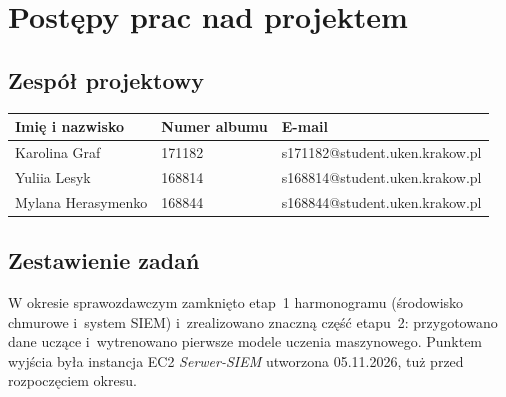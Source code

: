 \documentclass[11pt,a4paper,oneside]{article}
\newif\ifpodpowiedzi
\newcommand{\podpowiedz}[1]{\ifpodpowiedzi\par\begingroup\small\color{hintcolor}\textit{Wskazówka: #1}\par\endgroup\fi}
\newcommand{\studentA}{{Karolina Graf}}
\newcommand{\studentB}{{Yuliia Lesyk}}
\newcommand{\studentC}{{Mylana Herasymenko}}
\newcommand{\albumA}{{171182}}
\newcommand{\albumB}{{168814}}
\newcommand{\albumC}{{168844}}
\begin{document}
\section{Postępy prac nad projektem}
\subsection{Zespół projektowy}
\podpowiedz{Podaj aktualne dane kontaktowe wszystkich członków zespołu. Imiona i nazwiska powinny być zgodne ze stroną tytułową. W przypadku zespołu dwuosobowego zatwierdzonego przez dyrekcję instytutu usuń dane trzeciej osoby ze strony tytułowej, obu tabel oraz odpowiedni blok opisu prac.}
\begin{tabularx}{\textwidth}{@{}Y p{0.22\textwidth} Y@{}}
\toprule
Imię i nazwisko & Numer albumu & E-mail\\
\midrule
\studentA & \albumA & {s171182@student.uken.krakow.pl}\\
\studentB & \albumB & {s168814@student.uken.krakow.pl}\\
\studentC & \albumC & {s168844@student.uken.krakow.pl}\\
\bottomrule
\end{tabularx}

\subsection{Zestawienie zadań}
\podpowiedz{Dla każdej osoby wymień zadania z danego okresu i ich stan: zakończone, w toku lub zablokowane. Przy pracy wspólnej wskaż konkretny wkład każdej osoby. Odwołania do opisów generuj poleceniem \texttt{\textbackslash ref}; nie wpisuj ręcznie numerów sekcji. Powielaj wiersze i opisy według potrzeb.}
W okresie sprawozdawczym zamknięto etap~1 harmonogramu (środowisko chmurowe i~system SIEM) i~zrealizowano znaczną część etapu~2: przygotowano dane uczące i~wytrenowano pierwsze modele uczenia maszynowego. Punktem wyjścia była instancja EC2 \textit{Serwer-SIEM} utworzona 05.11.2026, tuż przed rozpoczęciem okresu.
\end{document}
